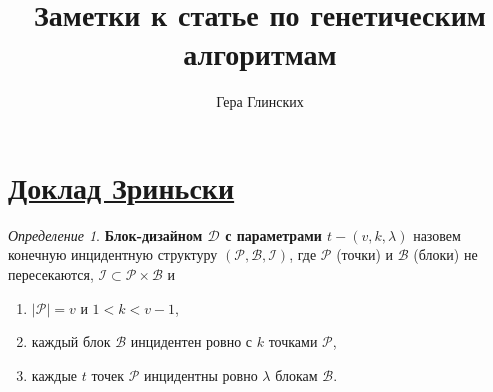 \documentclass[a4,12pt]{article}
\author{Гера Глинских}
\title{Заметки к статье по генетическим алгоритмам}
\theoremstyle{remark}
\newtheorem{defi}{Определение}
\newcommand{\bdd}{\mathcal{D}}
\newcommand{\bdp}{\mathcal{P}}
\newcommand{\bdb}{\mathcal{B}}
\newcommand{\bdi}{\mathcal{I}}
\begin{document}
\maketitle{}

\section{\href{https://github.com/glinskikhg/combinatorics-summer/blob/f136271012f137d1f71936810deeffd4e36ccef6/docs/talk_zrinski-1.pdf}{Доклад Зриньски}}

\begin{defi}
\textbf{Блок-дизайном $\bdd$ с параметрами $t-(v,k,\lambda)$} назовем конечную инцидентную структуру $(\bdp,\bdb,\bdi)$, где $\bdp$ (точки) и $\bdb$ (блоки) не пересекаются, $\bdi \subset \bdp \times \bdb$ и
\begin{enumerate}
    \item $|\bdp| = v$ и $1 < k < v - 1$,
    \item каждый блок $\bdb$ инцидентен ровно с $k$ точками $\bdp$,
    \item каждые $t$ точек $\bdp$ инцидентны ровно $\lambda$ блокам $\bdb$.
\end{enumerate}
\end{defi}
\end{document}
